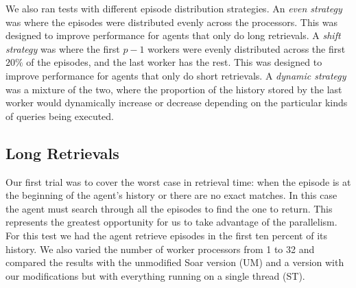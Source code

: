 \documentclass[11pt]{article} %
\begin{document}
We also ran tests with different episode distribution strategies. An \emph{even strategy} was
where the episodes were distributed evenly across the processors. This was designed to
improve performance for agents that only do long retrievals. A \emph{shift strategy} was
where the first $p-1$ workers were evenly distributed across the first $20\%$ of the episodes, and 
the last worker has the rest. This was designed to improve performance for agents that only do
short retrievals. A \emph{dynamic strategy} was a mixture of the two, where the proportion of the 
history stored by the last worker would dynamically increase or decrease depending on the particular
kinds of queries being executed. 


\subsection{Long Retrievals}
Our first trial was to cover the worst case in retrieval time: when the episode is at the beginning of 
the agent's history or there are no exact matches. In this case the agent must search through all 
the episodes to find the one to return. This represents the greatest opportunity for us to take advantage 
of the parallelism. For this test we had the agent retrieve episodes in the first ten percent of its history. 
We also varied the number of worker processors from 1 to 32 and compared the results with the unmodified 
Soar version (UM) and a version with our modifications but with everything running on a single thread (ST). 
\end{document}
